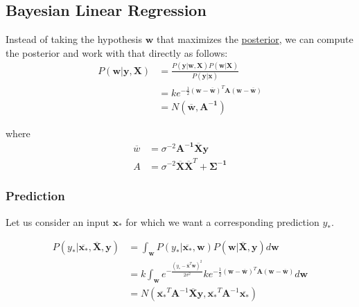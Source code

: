 \documentclass[12pt]{article}
\begin{document}
    \subsection{Bayesian Linear Regression} \label{sec:BayesianLinearRegression}
        Instead of taking the hypothesis $\boldsymbol{w}$ that maximizes the \hyperref[fact:Posterior]{posterior}, we
        can compute the posterior and work with that directly as follows:
        \begin{align*}
            P(\boldsymbol{w}|\boldsymbol{y}, \boldsymbol{X}) &= \frac{P(\boldsymbol{y}|\boldsymbol{w}, \boldsymbol{X})P(\boldsymbol{w}|\boldsymbol{X})}{P(\boldsymbol{y}|\boldsymbol{x})} \\
            &= ke^{-\frac{1}{2}(\boldsymbol{w}-\overline{\boldsymbol{w}})^T\boldsymbol{A}(\boldsymbol{w}-\overline{\boldsymbol{w}})} \\
            &= N(\overline{\boldsymbol{w}}, \boldsymbol{A^{-1}})
        \end{align*}

        where
        \begin{align*}
        \overline{w} &= \sigma^{-2}\boldsymbol{A^{-1}}\overline{\boldsymbol{X}}\boldsymbol{y} \\
        A &= \sigma^{-2}\boldsymbol{\overline{X}\overline{X}}^T + \boldsymbol{\Sigma^{-1}}
        \end{align*}

        \subsubsection{Prediction}
            Let us consider an input $\boldsymbol{x_*}$ for which we want a corresponding prediction $y_*$.

            \begin{align*}
                P(y_*|\overline{\boldsymbol{x_*}}, \overline{\boldsymbol{X}}, \boldsymbol{y}) &= \int_{\boldsymbol{w}} P(y_*|\overline{\boldsymbol{x_*}},\boldsymbol{w})P(\boldsymbol{w}|\overline{\boldsymbol{X}},\boldsymbol{y})d\boldsymbol{w} \\
                &= k \int_{\boldsymbol{w}} e^{-\frac{(y_* - \overline{\boldsymbol{x}}^T\boldsymbol{w})^2}{2\sigma^2}} ke^{-\frac{1}{2}(\boldsymbol{w}-\overline{\boldsymbol{w}})^T\boldsymbol{A}(\boldsymbol{w}-\overline{\boldsymbol{w}})}d\boldsymbol{w} \\
                &= N(\overline{\boldsymbol{x_*}}^T \boldsymbol{A}^{-1}\overline{\boldsymbol{X}}\boldsymbol{y}, \overline{\boldsymbol{x_*}}^T \boldsymbol{A}^{-1} \overline{\boldsymbol{x_*}})
            \end{align*}
\end{document}
